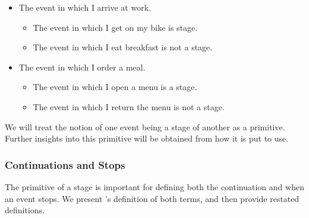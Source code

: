 \begin{note}
  \begin{itemize}
  \item
    The event in which I arrive at work.
    \begin{itemize}[noitemsep]
    \item
      The event in which I get on my bike is stage.
    \item
      The event in which I eat breakfast is not a stage.
    \end{itemize}
  \end{itemize}

  \begin{itemize}
  \item
    The event in which I order a meal.
    \begin{itemize}[noitemsep]
    \item
      The event in which I open a menu is a stage.
    \item
      The event in which I return the menu is not a stage.
    \end{itemize}
  \end{itemize}

  We will treat the notion of one event being a stage of another as a primitive.
  Further insights into this primitive will be obtained from how it is put to use.
\end{note}

\subsubsection{Continuations and Stops}

\begin{note}
  The primitive of a stage is important for defining both the continuation and when an event stops.
  We present \citeauthor{Landman:1992wh}'s definition of both terms, and then provide restated definitions.
\end{note}


